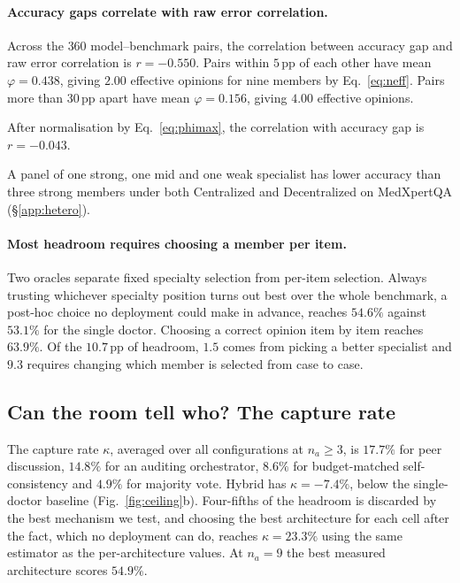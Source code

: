 \paragraph{Accuracy gaps correlate with raw error correlation.}
Across the $360$ model--benchmark pairs, the correlation between accuracy gap and raw error
correlation is $r = -0.550$. Pairs within $5$\,pp of each other have mean
$\varphi = 0.438$, giving $2.00$ effective opinions for nine members by Eq.~\ref{eq:neff}.
Pairs more than $30$\,pp apart have mean $\varphi = 0.156$, giving $4.00$ effective opinions.

After normalisation by Eq.~\ref{eq:phimax}, the correlation with accuracy gap is $r = -0.043$.

A panel of one strong, one mid and one weak specialist has lower accuracy than three strong
members under both Centralized and Decentralized on MedXpertQA (\S\ref{app:hetero}).

\paragraph{Most headroom requires choosing a member per item.}
Two oracles separate fixed specialty selection from per-item selection. Always trusting whichever
specialty position turns out best over the whole benchmark, a post-hoc choice no deployment could
make in advance, reaches $54.6\%$ against $53.1\%$ for the single doctor.
Choosing a correct opinion item by item reaches $63.9\%$. Of the $10.7$\,pp of headroom, $1.5$
comes from picking a better specialist and $9.3$ requires changing which member is selected
from case to case.

\subsection{Can the room tell who? The capture rate}
\label{sec:ceiling}

The capture rate $\kappa$, averaged over all configurations at $n_a \geq 3$, is $17.7\%$ for
peer discussion, $14.8\%$ for an auditing orchestrator, $8.6\%$ for budget-matched
self-consistency and $4.9\%$ for majority vote. Hybrid has $\kappa = -7.4\%$, below the
single-doctor baseline
(Fig.~\ref{fig:ceiling}b). Four-fifths of the headroom is discarded by the best mechanism we test,
and choosing the best architecture for each cell after the fact, which no deployment can do,
reaches $\kappa = 23.3\%$ using the same estimator as the per-architecture values.
At $n_a{=}9$ the best measured architecture scores $54.9\%$.

